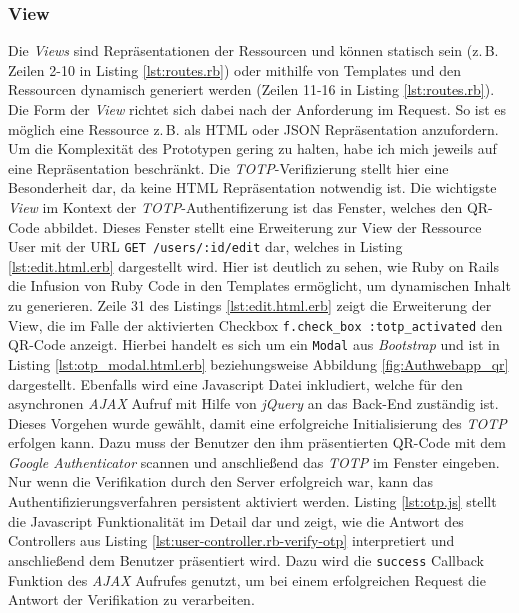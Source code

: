 \documentclass[11pt,a4paper,ngerman]{scrreprt}
\begin{document}
\subsubsection{View}
Die \textit{Views} sind Repräsentationen der Ressourcen und können statisch sein (z.\,B. Zeilen 2-10 in Listing \ref{lst:routes.rb}) oder mithilfe von Templates und den Ressourcen dynamisch generiert werden (Zeilen 11-16 in Listing \ref{lst:routes.rb}). Die Form der \textit{View} richtet sich dabei nach der Anforderung im Request. So ist es möglich eine Ressource z.\,B. als HTML oder JSON Repräsentation anzufordern. Um die Komplexität des Prototypen gering zu halten, habe ich mich jeweils auf eine Repräsentation beschränkt. Die \textit{TOTP}-Verifizierung stellt hier eine Besonderheit dar, da keine HTML Repräsentation notwendig ist. Die wichtigste \textit{View} im Kontext der \textit{TOTP}-Authentifizerung ist das Fenster, welches den QR-Code abbildet. Dieses Fenster stellt eine Erweiterung zur View der Ressource User mit der URL \texttt{GET /users/:id/edit} dar, welches in Listing \ref{lst:edit.html.erb} dargestellt wird. Hier ist deutlich zu sehen, wie Ruby on Rails die Infusion von Ruby Code in den Templates ermöglicht, um dynamischen Inhalt zu generieren. Zeile 31 des Listings \ref{lst:edit.html.erb} zeigt die Erweiterung der View, die im Falle der aktivierten Checkbox \texttt{f.check\_box :totp\_activated} den QR-Code anzeigt. Hierbei handelt es sich um ein \texttt{Modal} aus \textit{Bootstrap} und ist in Listing \ref{lst:otp_modal.html.erb} beziehungsweise Abbildung \ref{fig:Authwebapp_qr} dargestellt. Ebenfalls wird eine Javascript Datei inkludiert, welche für den asynchronen \textit{AJAX} Aufruf mit Hilfe von \textit{jQuery} an das Back-End zuständig ist. Dieses Vorgehen wurde gewählt, damit eine erfolgreiche Initialisierung des \textit{TOTP} erfolgen kann. Dazu muss der Benutzer den ihm präsentierten QR-Code mit dem \textit{Google Authenticator} scannen und anschließend das \textit{TOTP} im Fenster eingeben. Nur wenn die Verifikation durch den Server erfolgreich war, kann das Authentifizierungsverfahren persistent aktiviert werden. Listing \ref{lst:otp.js} stellt die Javascript Funktionalität im Detail dar und zeigt, wie die Antwort des Controllers aus Listing \ref{lst:user-controller.rb-verify-otp} interpretiert und anschließend dem Benutzer präsentiert wird. Dazu wird die \texttt{success} Callback Funktion des \textit{AJAX} Aufrufes genutzt, um bei einem erfolgreichen Request die Antwort der Verifikation zu verarbeiten.
\end{document}
